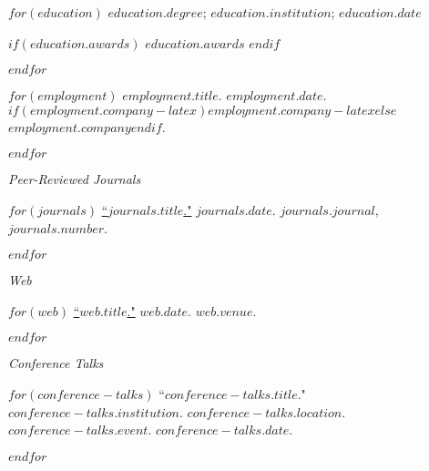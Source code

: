 \documentclass[11pt,article,oneside]{memoir}
\begin{document}
\medskip

\reversemarginpar

\bigskip


$for(education)$
\ind $education.degree$; $education.institution$; $education.date$

$if(education.awards)$
\ind \hspace{0.35in} \footnotesize $education.awards$ \normalsize \vspace{0.05in}
$endif$

\smallskip
$endfor$

\bigskip


$for(employment)$
\ind $employment.title$. $employment.date$. $if(employment.company-latex)$$employment.company-latex$$else$$employment.company$$endif$.

\smallskip
$endfor$

\bigskip
\pagebreak[1]


\ind \emph{Peer-Reviewed Journals}

\smallskip

$for(journals)$
\ind \href{$journals.url$}{``$journals.title$."} $journals.date$. \emph{$journals.journal$}, $journals.number$.

\smallskip
$endfor$
\medskip

\ind \emph{Web}

\smallskip

$for(web)$
\ind \href{$web.url$}{``$web.title$."} $web.date$. \emph{$web.venue$}. 

\smallskip
$endfor$

\bigskip
\pagebreak[1]


\ind \emph{Conference Talks}

\smallskip

$for(conference-talks)$
\ind ``$conference-talks.title$." $conference-talks.institution$. $conference-talks.location$. \emph{$conference-talks.event$}. $conference-talks.date$. \normalsize

\smallskip
$endfor$
\medskip
\end{document}
